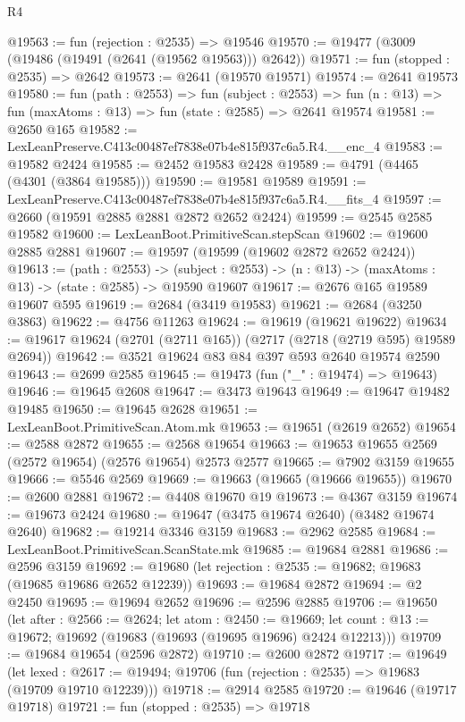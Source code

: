 \begin{lexlean}{R4}
\begin{coremodule}
@19563 := fun (rejection : @2535) => @19546
@19570 := @19477 (@3009 (@19486 (@19491 (@2641 (@19562 @19563))) @2642))
@19571 := fun (stopped : @2535) => @2642
@19573 := @2641 (@19570 @19571)
@19574 := @2641 @19573
@19580 := fun (path : @2553) =>
  fun (subject : @2553) =>
  fun (n : @13) => fun (maxAtoms : @13) => fun (state : @2585) => @2641 @19574
@19581 := @2650 @165
@19582 := LexLeanPreserve.C413c00487ef7838e07b4e815f937c6a5.R4.__enc_4
@19583 := @19582 @2424
@19585 := @2452 @19583 @2428
@19589 := @4791 (@4465 (@4301 (@3864 @19585)))
@19590 := @19581 @19589
@19591 := LexLeanPreserve.C413c00487ef7838e07b4e815f937c6a5.R4.__fits_4
@19597 := @2660 (@19591 @2885 @2881 @2872 @2652 @2424)
@19599 := @2545 @2585 @19582
@19600 := LexLeanBoot.PrimitiveScan.stepScan
@19602 := @19600 @2885 @2881
@19607 := @19597 (@19599 (@19602 @2872 @2652 @2424))
@19613 := (path : @2553) ->
  (subject : @2553) -> (n : @13) -> (maxAtoms : @13) -> (state : @2585) -> @19590 @19607
@19617 := @2676 @165 @19589 @19607 @595
@19619 := @2684 (@3419 @19583)
@19621 := @2684 (@3250 @3863)
@19622 := @4756 @11263
@19624 := @19619 (@19621 @19622)
@19634 := @19617 @19624 (@2701 (@2711 @165)) (@2717 (@2718 (@2719 @595) @19589 @2694))
@19642 := @3521 @19624 @83 @84 @397 @593 @2640 @19574 @2590
@19643 := @2699 @2585
@19645 := @19473 (fun ("_" : @19474) => @19643)
@19646 := @19645 @2608
@19647 := @3473 @19643
@19649 := @19647 @19482 @19485
@19650 := @19645 @2628
@19651 := LexLeanBoot.PrimitiveScan.Atom.mk
@19653 := @19651 (@2619 @2652)
@19654 := @2588 @2872
@19655 := @2568 @19654
@19663 := @19653 @19655 @2569 (@2572 @19654) (@2576 @19654) @2573 @2577
@19665 := @7902 @3159 @19655
@19666 := @5546 @2569
@19669 := @19663 (@19665 (@19666 @19655))
@19670 := @2600 @2881
@19672 := @4408 @19670 @19
@19673 := @4367 @3159
@19674 := @19673 @2424
@19680 := @19647 (@3475 @19674 @2640) (@3482 @19674 @2640)
@19682 := @19214 @3346 @3159
@19683 := @2962 @2585
@19684 := LexLeanBoot.PrimitiveScan.ScanState.mk
@19685 := @19684 @2881
@19686 := @2596 @3159
@19692 := @19680 (let rejection : @2535 := @19682; @19683 (@19685 @19686 @2652 @12239))
@19693 := @19684 @2872
@19694 := @2 @2450
@19695 := @19694 @2652
@19696 := @2596 @2885
@19706 := @19650
    (let after : @2566 := @2624;
    let atom : @2450 := @19669;
    let count : @13 := @19672; @19692 (@19683 (@19693 (@19695 @19696) @2424 @12213)))
@19709 := @19684 @19654 (@2596 @2872)
@19710 := @2600 @2872
@19717 := @19649
    (let lexed : @2617 := @19494; @19706 (fun (rejection : @2535) => @19683 (@19709 @19710 @12239)))
@19718 := @2914 @2585
@19720 := @19646 (@19717 @19718)
@19721 := fun (stopped : @2535) => @19718

\end{coremodule}
\end{lexlean}
